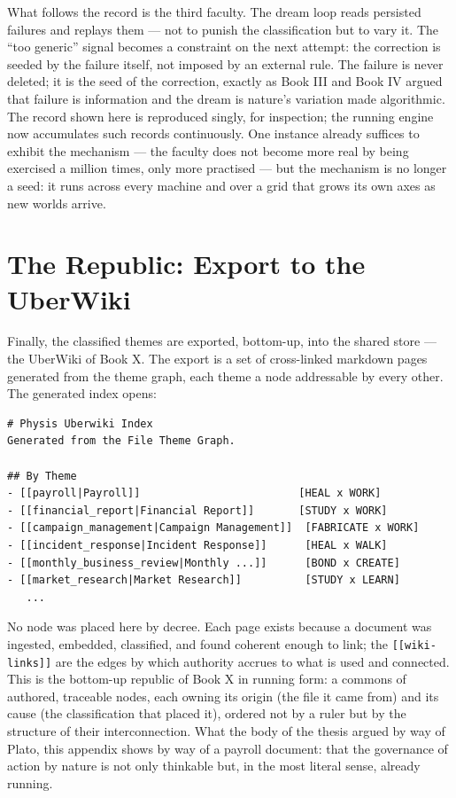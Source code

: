 What follows the record is the third faculty. The dream loop reads persisted
failures and replays them --- not to punish the classification but to vary it. The
``too generic'' signal becomes a constraint on the next attempt: the correction
is seeded by the failure itself, not imposed by an external rule. The failure
is never deleted; it is the seed of the correction, exactly as Book III and Book
IV argued that failure is information and the dream is nature's variation made
algorithmic. The record shown here is reproduced singly, for inspection; the
running engine now accumulates such records continuously. One instance already
suffices to exhibit the mechanism --- the faculty does not become more real by
being exercised a million times, only more practised --- but the mechanism is no
longer a seed: it runs across every machine and over a grid that grows its own
axes as new worlds arrive.

\section{The Republic: Export to the UberWiki}

Finally, the classified themes are exported, bottom-up, into the shared store ---
the UberWiki of Book X. The export is a set of cross-linked markdown pages
generated from the theme graph, each theme a node addressable by every other.
The generated index opens:

\begin{lstlisting}
# Physis Uberwiki Index
Generated from the File Theme Graph.

## By Theme
- [[payroll|Payroll]]                         [HEAL x WORK]
- [[financial_report|Financial Report]]       [STUDY x WORK]
- [[campaign_management|Campaign Management]]  [FABRICATE x WORK]
- [[incident_response|Incident Response]]      [HEAL x WALK]
- [[monthly_business_review|Monthly ...]]      [BOND x CREATE]
- [[market_research|Market Research]]          [STUDY x LEARN]
   ...
\end{lstlisting}

No node was placed here by decree. Each page exists because a document was
ingested, embedded, classified, and found coherent enough to link; the
\texttt{[[wiki-links]]} are the edges by which authority accrues to what is used
and connected. This is the bottom-up republic of Book X in running
form: a commons of authored, traceable nodes, each owning its origin (the file it
came from) and its cause (the classification that placed it), ordered not by a
ruler but by the structure of their interconnection. What the body of the thesis
argued by way of Plato, this appendix shows by way of a payroll document: that the
governance of action by nature is not only thinkable but, in the most literal
sense, already running.

